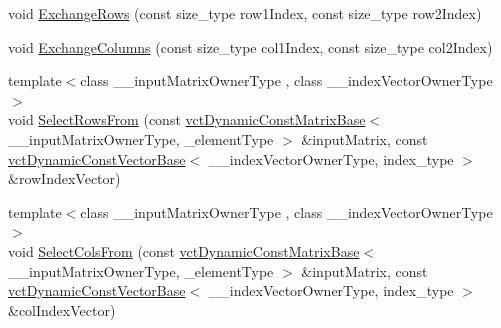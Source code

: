{\bf }\par
\begin{DoxyCompactItemize}
\item 
void \hyperlink{classvct_dynamic_matrix_base_a7c644d6c39bb725b915da36787d7e95a}{Exchange\+Rows} (const size\+\_\+type row1\+Index, const size\+\_\+type row2\+Index)
\item 
void \hyperlink{classvct_dynamic_matrix_base_ab6745c494fb3da5cfc1aa6027fc10e55}{Exchange\+Columns} (const size\+\_\+type col1\+Index, const size\+\_\+type col2\+Index)
\item 
{\footnotesize template$<$class \+\_\+\+\_\+input\+Matrix\+Owner\+Type , class \+\_\+\+\_\+index\+Vector\+Owner\+Type $>$ }\\void \hyperlink{classvct_dynamic_matrix_base_ae24612ba0e98aa1474d1e8c891107dff}{Select\+Rows\+From} (const \hyperlink{classvct_dynamic_const_matrix_base}{vct\+Dynamic\+Const\+Matrix\+Base}$<$ \+\_\+\+\_\+input\+Matrix\+Owner\+Type, \+\_\+element\+Type $>$ \&input\+Matrix, const \hyperlink{classvct_dynamic_const_vector_base}{vct\+Dynamic\+Const\+Vector\+Base}$<$ \+\_\+\+\_\+index\+Vector\+Owner\+Type, index\+\_\+type $>$ \&row\+Index\+Vector)
\item 
{\footnotesize template$<$class \+\_\+\+\_\+input\+Matrix\+Owner\+Type , class \+\_\+\+\_\+index\+Vector\+Owner\+Type $>$ }\\void \hyperlink{classvct_dynamic_matrix_base_a03fc07021cd25f8e3a86673718724570}{Select\+Cols\+From} (const \hyperlink{classvct_dynamic_const_matrix_base}{vct\+Dynamic\+Const\+Matrix\+Base}$<$ \+\_\+\+\_\+input\+Matrix\+Owner\+Type, \+\_\+element\+Type $>$ \&input\+Matrix, const \hyperlink{classvct_dynamic_const_vector_base}{vct\+Dynamic\+Const\+Vector\+Base}$<$ \+\_\+\+\_\+index\+Vector\+Owner\+Type, index\+\_\+type $>$ \&col\+Index\+Vector)
\end{DoxyCompactItemize}

